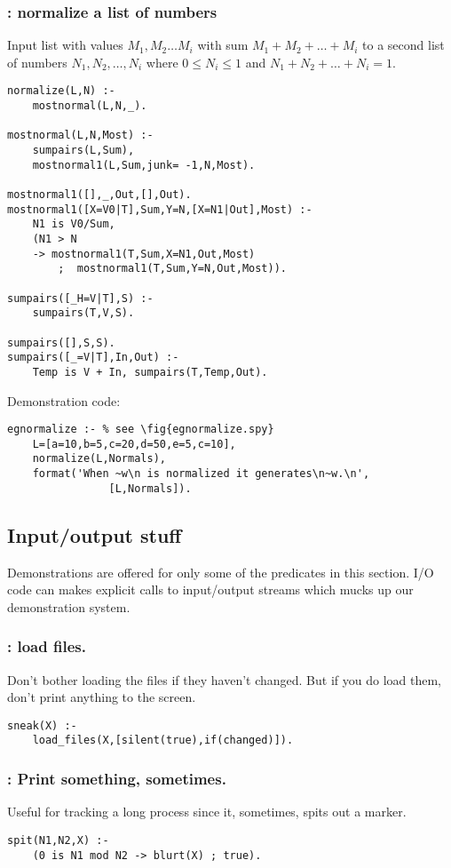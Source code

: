 \subsubsection{ : normalize a list of numbers
}
\label{sec:normalize/2}
Input list with values $M_1,M_2\ldots M_i$
with sum $M_1+M_2+\ldots + M_i$ to
a second list of numbers  $N_1,N_2,\ldots,N_i$
where $0\le N_i\le1$ and $N_1+N_2+\ldots+N_i=1$.
\begin{Verbatim}
normalize(L,N) :- 
    mostnormal(L,N,_).

mostnormal(L,N,Most) :-
    sumpairs(L,Sum), 
    mostnormal1(L,Sum,junk= -1,N,Most).

mostnormal1([],_,Out,[],Out).
mostnormal1([X=V0|T],Sum,Y=N,[X=N1|Out],Most) :-
    N1 is V0/Sum,
    (N1 > N
    -> mostnormal1(T,Sum,X=N1,Out,Most)
        ;  mostnormal1(T,Sum,Y=N,Out,Most)).

sumpairs([_H=V|T],S) :- 
    sumpairs(T,V,S).

sumpairs([],S,S).
sumpairs([_=V|T],In,Out) :- 
    Temp is V + In, sumpairs(T,Temp,Out).
\end{Verbatim}
Demonstration code: 
\begin{Verbatim}
egnormalize :- % see \fig{egnormalize.spy}
    L=[a=10,b=5,c=20,d=50,e=5,c=10],
    normalize(L,Normals),
    format('When ~w\n is normalized it generates\n~w.\n',
                [L,Normals]).
\end{Verbatim}
\subsection{ Input/output stuff
}
Demonstrations are offered for only some of the predicates in this
section. I/O code can makes explicit calls to
input/output streams which mucks up our demonstration system.
\subsubsection{ : load files.
}
Don't bother loading the files if they haven't changed.
But if you do load them, don't print anything to the screen.
\begin{Verbatim}
sneak(X) :- 
    load_files(X,[silent(true),if(changed)]).
\end{Verbatim}
\subsubsection{ : Print something, sometimes.
}
Useful for tracking a long process since it, sometimes,
spits out a marker.
\begin{Verbatim}
spit(N1,N2,X) :- 
    (0 is N1 mod N2 -> blurt(X) ; true).
\end{Verbatim}

